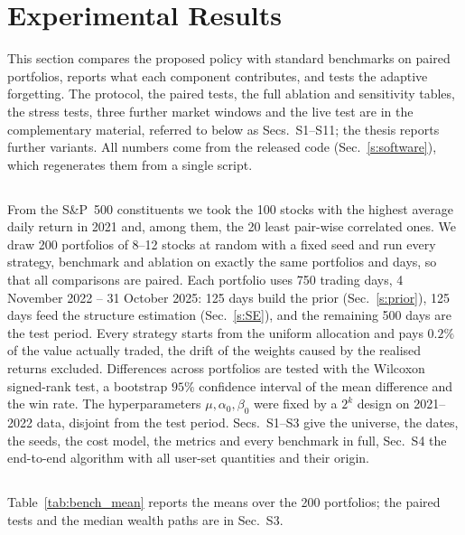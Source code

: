 \section{Experimental Results}
\label{s:experiments}
This section compares the proposed policy with standard benchmarks on paired portfolios, reports what each component contributes, and tests the adaptive forgetting. The protocol, the paired tests, the full ablation and sensitivity tables, the stress tests, three further market windows and the live test are in the complementary material, referred to below as Secs.~S1--S11; the thesis \cite{Pro:26} reports further variants. All numbers come from the released code (Sec.~\ref{s:software}), which regenerates them from a single script.

\subsection{} \label{s:data}
From the S\&P~500 constituents we took the 100 stocks with the highest average daily return in 2021 and, among them, the 20 least pair-wise correlated ones. We draw 200 portfolios of 8--12 stocks at random with a fixed seed and run every strategy, benchmark and ablation on exactly the same portfolios and days, so that all comparisons are paired. Each portfolio uses 750 trading days, 4 November 2022 -- 31 October 2025: 125 days build the prior (Sec.~\ref{s:prior}), 125 days feed the structure estimation (Sec.~\ref{s:SE}), and the remaining 500 days are the test period. Every strategy starts from the uniform allocation and pays $0.2\%$ of the value actually traded, the drift of the weights caused by the realised returns excluded. Differences across portfolios are tested with the Wilcoxon signed-rank test, a bootstrap $95\%$ confidence interval of the mean difference and the win rate. The hyperparameters $\mu,\alpha_0,\beta_0$ were fixed by a $2^k$ design \cite{4736103} on 2021--2022 data, disjoint from the test period. Secs.~S1--S3 give the universe, the dates, the seeds, the cost model, the metrics and every benchmark in full, Sec.~S4 the end-to-end algorithm with all user-set quantities and their origin.

\subsection{} \label{s:results}
Table~\ref{tab:bench_mean} reports the means over the 200 portfolios; the paired tests and the median wealth paths are in Sec.~S3.

